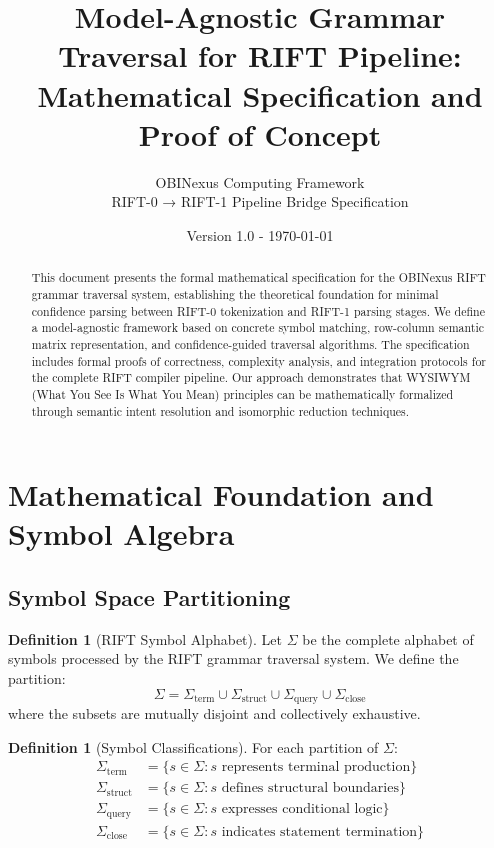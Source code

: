 \documentclass[11pt,a4paper]{article}
\title{Model-Agnostic Grammar Traversal for RIFT Pipeline:\\
Mathematical Specification and Proof of Concept}
\author{OBINexus Computing Framework\\
RIFT-0 → RIFT-1 Pipeline Bridge Specification}
\date{Version 1.0 - \today}
\theoremstyle{definition}
\newtheorem{definition}[theorem]{Definition}
\theoremstyle{remark}
\begin{document}
\maketitle

\begin{abstract}
This document presents the formal mathematical specification for the OBINexus RIFT grammar traversal system, establishing the theoretical foundation for minimal confidence parsing between RIFT-0 tokenization and RIFT-1 parsing stages. We define a model-agnostic framework based on concrete symbol matching, row-column semantic matrix representation, and confidence-guided traversal algorithms. The specification includes formal proofs of correctness, complexity analysis, and integration protocols for the complete RIFT compiler pipeline. Our approach demonstrates that WYSIWYM (What You See Is What You Mean) principles can be mathematically formalized through semantic intent resolution and isomorphic reduction techniques.
\end{abstract}

\tableofcontents


\section{Mathematical Foundation and Symbol Algebra}
\label{sec:foundation}

\subsection{Symbol Space Partitioning}
\label{subsec:symbol-partition}

\begin{definition}[RIFT Symbol Alphabet]
Let $\Sigma$ be the complete alphabet of symbols processed by the RIFT grammar traversal system. We define the partition:
\begin{equation}
\Sigma = \Sigma_{\text{term}} \cup \Sigma_{\text{struct}} \cup \Sigma_{\text{query}} \cup \Sigma_{\text{close}}
\end{equation}
where the subsets are mutually disjoint and collectively exhaustive.
\end{definition}

\begin{definition}[Symbol Classifications]
For each partition of $\Sigma$:
\begin{align}
\Sigma_{\text{term}} &= \{s \in \Sigma : s \text{ represents terminal production}\} \\
\Sigma_{\text{struct}} &= \{s \in \Sigma : s \text{ defines structural boundaries}\} \\
\Sigma_{\text{query}} &= \{s \in \Sigma : s \text{ expresses conditional logic}\} \\
\Sigma_{\text{close}} &= \{s \in \Sigma : s \text{ indicates statement termination}\}
\end{align}
\end{definition}
\end{document}
